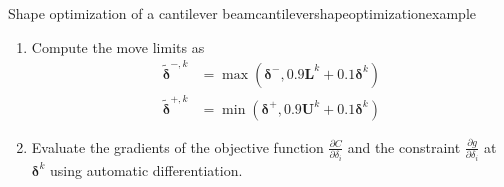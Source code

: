 \begin{example}{Shape optimization of a cantilever beam}{cantilevershapeoptimizationexample}
\begin{enumerate}
\begin{equation}
\begin{cases}
            \end{cases}
        \end{equation}
        \item Compute the move limits as 
        \begin{align}
            \tilde{\pmb{\delta}}^{-,k} &= \max(\pmb{\delta}^-,  0.9 \mathbf{L}^k + 0.1 \pmb{\delta}^k) \\
            \tilde{\pmb{\delta}}^{+,k} &= \min(\pmb{\delta}^+,  0.9 \mathbf{U}^k + 0.1 \pmb{\delta}^k)
        \end{align}

        \item Evaluate the gradients of the objective function $\frac{\partial C}{\partial \delta_i}$ and the constraint $\frac{\partial g}{\partial \delta_i}$ at $\pmb{\delta}^k$ using automatic differentiation. 


\end{enumerate}
\end{example}
